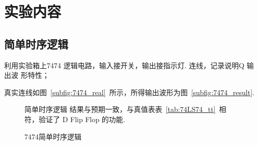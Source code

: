 \documentclass[11pt]{SEU-Digital-Report}
\begin{document}
    \newpage
    \section{实验内容}

      \subsection{简单时序逻辑}

      利用实验箱上7474 逻辑电路，输入接开关，输出接指示灯. 连线，记录说明Q 输出波
形特性；

    真实连线如图~\ref{subfig:7474_real}~所示，所得输出波形为图~\ref{subfig:7474_result}.

    \begin{figure}[htbp]
      \centering
      \caption{7474简单时序逻辑}

      \begin{analyze}{简单时序逻辑}{}
        结果与预期一致，与真值表表~\ref{tab:74LS74_tt}~相符，验证了 D Flip Flop 的功能.
      \end{analyze}

    \end{figure}
\end{document}
